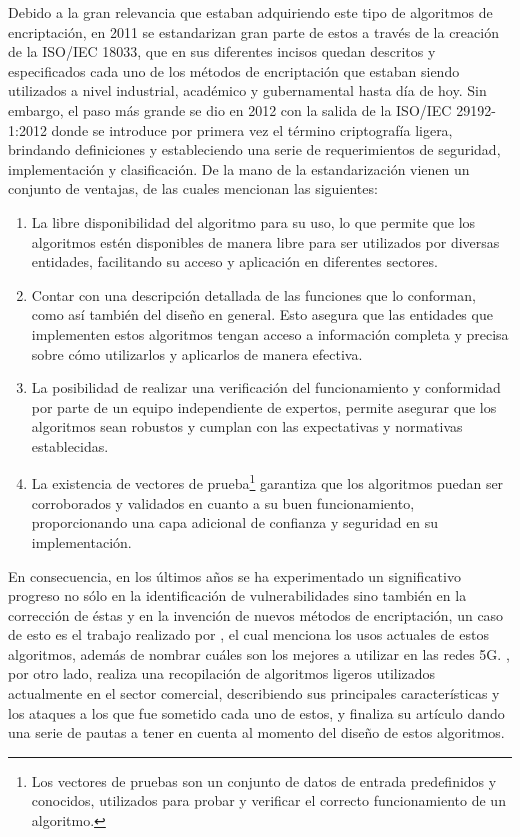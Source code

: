 \documentclass[a4paper,10pt]{article}
\begin{document}
	Debido a la gran relevancia que estaban adquiriendo este tipo de algoritmos de encriptación, en 2011 se estandarizan gran parte de estos a través de la creación de la ISO/IEC 18033, que en sus diferentes incisos quedan descritos y especificados cada uno de los métodos de encriptación que estaban siendo utilizados a nivel industrial, académico y gubernamental hasta día de hoy. Sin embargo, el paso más grande se dio en 2012 con la salida de la ISO/IEC 29192-1:2012 donde se introduce por primera vez el término criptografía ligera, brindando definiciones y estableciendo una serie de requerimientos de seguridad, implementación y clasificación. De la mano de la estandarización vienen un conjunto de ventajas, de las cuales \textcite{eterovic15stream} mencionan las siguientes:
	\begin{enumerate}
		\item La libre disponibilidad del algoritmo para su uso, lo que permite que los algoritmos estén disponibles de manera libre para ser utilizados por diversas entidades, facilitando su acceso y aplicación en diferentes sectores.
		\item Contar con una descripción detallada de las funciones que lo conforman, como así también del diseño en general. Esto asegura que las entidades que implementen estos algoritmos tengan acceso a información completa y precisa sobre cómo utilizarlos y aplicarlos de manera efectiva.
		\item La posibilidad de realizar una verificación del funcionamiento y conformidad por parte de un equipo independiente de expertos, permite asegurar que los algoritmos sean robustos y cumplan con las expectativas y normativas establecidas.
		\item La existencia de vectores de prueba\footnote{Los vectores de pruebas son un conjunto de datos de entrada predefinidos y conocidos, utilizados para probar y verificar el correcto funcionamiento de un algoritmo.} garantiza que los algoritmos puedan ser corroborados y validados en cuanto a su buen funcionamiento, proporcionando una capa adicional de confianza y seguridad en su implementación.
	\end{enumerate}
	En consecuencia, en los últimos años se ha experimentado un significativo progreso no sólo en la identificación de vulnerabilidades sino también en la corrección de éstas y en la invención de nuevos métodos de encriptación, un caso de esto es el trabajo realizado por \textcite{gunathilake2019next}, el cual menciona los usos actuales de estos algoritmos, además de nombrar cuáles son los mejores a utilizar en las redes 5G. \textcite{eterovic2019criptografia}, por otro lado, realiza una recopilación de algoritmos ligeros utilizados actualmente en el sector comercial, describiendo sus principales características y los ataques a los que fue sometido cada uno de estos, y finaliza su artículo dando una serie de pautas a tener en cuenta al momento del diseño de estos algoritmos.
	
\end{document}
